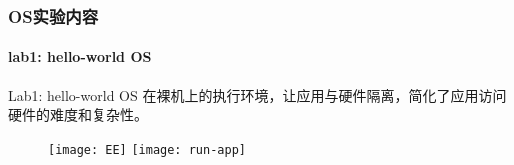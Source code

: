 \begin{frame}
    \frametitle{OS实验内容}
    \framesubtitle{lab1: hello-world OS}
    \begin{block}{Lab1:  hello-world OS}
        在裸机上的执行环境，让应用与硬件隔离，简化了应用访问硬件的难度和复杂性。
    \end{block}
    
    \begin{figure}
        \centering
        \texttt{[image: EE]} %
        \texttt{[image: run-app]}
    \end{figure}
    
\end{frame}

